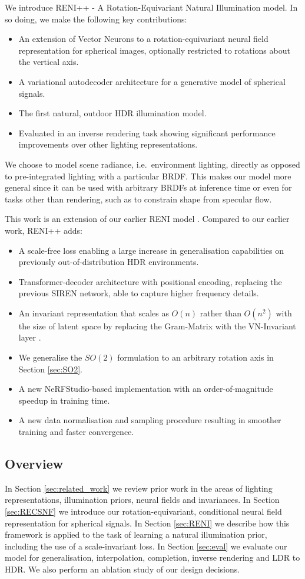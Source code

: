 We introduce RENI++ - A Rotation-Equivariant Natural Illumination model. In so doing, we make the following key contributions:
\begin{itemize}
\item[--] An extension of Vector Neurons to a rotation-equivariant neural field representation for spherical images, optionally restricted to rotations about the vertical axis.
\item[--] A variational autodecoder architecture for a generative model of spherical signals.
\item[--] The first natural, outdoor HDR illumination model.
\item[--] Evaluated in an inverse rendering task showing significant performance improvements over other lighting representations.
\end{itemize}
We choose to model scene radiance, i.e.~environment lighting, directly as opposed to pre-integrated lighting with a particular BRDF. This makes our model more general since it can be used with arbitrary BRDFs at inference time or even for tasks other than rendering, such as to constrain shape from specular flow.

This work is an extension of our earlier RENI model \cite{gardner2022rotation}. Compared to our earlier work, RENI++ adds: 
\begin{itemize}
\item[--] A scale-free loss enabling a large increase in generalisation capabilities on previously out-of-distribution HDR environments.
\item[--] Transformer-decoder architecture with positional encoding, replacing the previous SIREN network, able to capture higher frequency details.
\item[--] An invariant representation that scales as \(O(n)\) rather than \(O(n^{2})\) with the size of latent space by replacing the Gram-Matrix with the VN-Invariant layer \cite{deng_vector_2021}.
\item[--] We generalise the $SO(2)$ formulation to an arbitrary rotation axis in Section \ref{sec:SO2}.
\item[--] A new NeRFStudio-based \cite{nerfstudio} implementation with an order-of-magnitude speedup in training time. 
\item[--] A new data normalisation and sampling procedure resulting in smoother training and faster convergence.
\end{itemize}
\subsection{Overview}

In Section \ref{sec:related_work} we review prior work in the areas of lighting representations, illumination priors, neural fields and invariances. In Section \ref{sec:RECSNF} we introduce our rotation-equivariant, conditional neural field representation for spherical signals. In Section \ref{sec:RENI} we describe how this framework is applied to the task of learning a natural illumination prior, including the use of a scale-invariant loss. In Section \ref{sec:eval} we evaluate our model for generalisation, interpolation, completion, inverse rendering and LDR to HDR. We also perform an ablation study of our design decisions.

